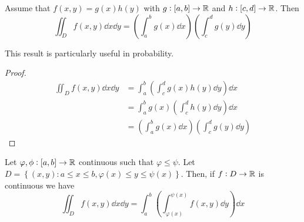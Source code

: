 \documentclass[12pt]{extarticle}
\begin{document}
\begin{corollary}
    Assume that $f(x, y) = g(x)h(y)$ with $g:[a,b] \to \mathbb{R}$ and $h:[c,d] \to \mathbb{R}$.
    Then
    \begin{equation}
        \iint_D f(x, y) \dd{x}\dd{y} = \left(\int_a^b g(x)\dd{x}\right) \left(\int_c ^d g(y)\dd{y}\right)
    \end{equation}

    This result is particularly useful in probability.
\end{corollary}

\begin{proof}
    \begin{align}
        \iint_D f(x, y) \dd{x}\dd{y} & = \int_a^b \left(\int_c^d g(x)h(y) \dd{y}\right) \dd{x}              \\
                                     & = \int_a^b g(x) \left(\int_c^d h(y) \dd{y}\right) \dd{x}             \\
                                     & = \left(\int_a^b g(x)\dd{x}\right) \left(\int_c ^d g(y)\dd{y}\right)
    \end{align}
\end{proof}

\begin{theorem}
    Let $\varphi, \phi: [a, b] \to \mathbb{R}$ continuous such that $\varphi \leq \psi$.
    Let $D = \left\{ (x, y) : a \leq x \leq b, \varphi(x) \leq y \leq \psi(x) \right\}$.
    Then, if $f: D \to \mathbb{R}$ is continuous we have
    \begin{equation}
        \iint_D f(x, y) \dd{x} \dd{y} = \int_a^b \left(\int_{\varphi(x)}^{\psi(x)} f(x, y) \dd{y}\right) \dd{x}
    \end{equation}
\end{theorem}
\end{document}
